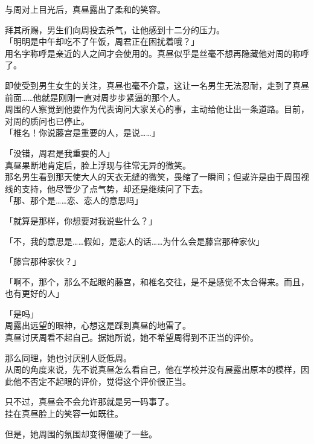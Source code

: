 与周对上目光后，真昼露出了柔和的笑容。

拜其所赐，男生们向周投去杀气，让他感到十二分的压力。\\

「明明是中午却吃不了午饭，周君正在困扰着哦？」\\

用名字称呼是亲近的人之间才会使用的。真昼似乎是丝毫不想再隐藏他对周的称呼了。

即使受到男生女生的关注，真昼也毫不介意，这让一名男生无法忍耐，走到了真昼前面……他就是刚刚一直对周步步紧逼的那个人。\\

周围的人察觉到他要作为代表询问大家关心的事，主动给他让出一条道路。目前，对周的质问也已停止。\\

「椎名！你说藤宫是重要的人，是说……」

「没错，周君是我重要的人」\\

真昼果断地肯定后，脸上浮现与往常无异的微笑。\\

那名男生看到那天使大人的天衣无缝的微笑，畏缩了一瞬间；但或许是由于周围视线的支持，他尽管少了点气势，却还是继续问了下去。\\

「那、那个是……恋、恋人的意思吗」

「就算是那样，你想要对我说些什么？」

「不，我的意思是……假如，是恋人的话……为什么会是藤宫那种家伙」

「藤宫那种家伙？」

「啊不，那个，那么不起眼的藤宫，和椎名交往，是不是感觉不太合得来。而且，也有更好的人」

「是吗」\\

周露出远望的眼神，心想这是踩到真昼的地雷了。\\

真昼讨厌周看不起自己。据她所说，她不希望周得到不正当的评价。

那么同理，她也讨厌别人贬低周。\\

从周的角度来说，先不说真昼怎么看自己，他在学校并没有展露出原本的模样，因此他不否定不起眼的评价，觉得这个评价很正当。

只不过，真昼会不会允许那就是另一码事了。\\

挂在真昼脸上的笑容一如既往。

但是，她周围的氛围却变得僵硬了一些。\\

